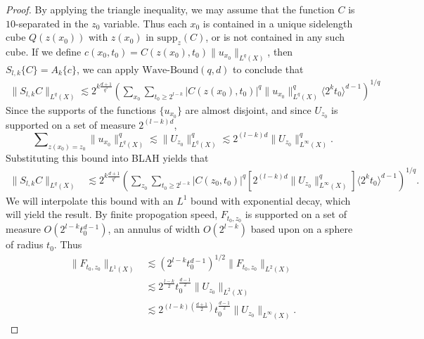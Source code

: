 \begin{proof}
    By applying the triangle inequality, we may assume that the function $C$ is $10$-separated in the $z_0$ variable. Thus each $x_0$ is contained in a unique sidelength cube $Q(z(x_0))$ with $z(x_0)$ in $\text{supp}_z(C)$, or is not contained in any such cube. If we define $c(x_0,t_0) = C(z(x_0),t_0) \| u_{x_0} \|_{L^q(X)}$, then $S_{l,k} \{ C \} = A_k \{ c \}$, we can apply $\text{Wave-Bound}(q,d)$ to conclude that
    \begin{align*}
      \| S_{l,k} C \|_{L^q(X)} \lesssim 2^{k \frac{d+1}{q^*}} \left( \sum\nolimits_{x_0} \sum\nolimits_{t_0 \geq 2^{l-k}} |C(z(x_0),t_0)|^q \| u_{x_0} \|_{L^q(X)}^q \langle 2^k t_0 \rangle^{d-1} \right)^{1/q}
    \end{align*}
    Since the supports of the functions $\{ u_{x_0} \}$ are almost disjoint, and since $U_{z_0}$ is supported on a set of measure $2^{(l-k)d}$,
    \[ \sum\nolimits_{z(x_0) = z_0} \| u_{x_0} \|_{L^q(X)}^q \lesssim \| U_{z_0} \|_{L^q(X)}^q \lesssim 2^{(l-k)d} \| U_{z_0} \|_{L^\infty(X)}^q. \]
    Substituting this bound into BLAH yields that
    \begin{align*}
        \| S_{l,k} C \|_{L^q(X)} &\lesssim 2^{k \frac{d+1}{q'}} \left( \sum\nolimits_{z_0} \sum\nolimits_{t_0 \geq 2^{l-k}} |C(z_0,t_0)|^q \left[ 2^{(l-k)d} \| U_{z_0} \|_{L^\infty(X)}^q \right] \langle 2^k t_0 \rangle^{d-1} \right)^{1/q}.
    \end{align*}
    We will interpolate this bound with an $L^1$ bound with exponential decay, which will yield the result. By finite propogation speed, $F_{t_0,z_0}$ is supported on a set of measure $O( 2^{l-k} t_0^{d-1})$, an annulus of width $O(2^{l-k})$ based upon on a sphere of radius $t_0$. Thus
    \begin{align*}
        \| F_{t_0,z_0} \|_{L^1(X)} &\lesssim \left( 2^{l-k} t_0^{d-1} \right)^{1/2} \| F_{t_0,z_0} \|_{L^2(X)}\\
        &\lesssim 2^{\frac{l-k}{2}} t_0^{\frac{d-1}{2}} \| U_{z_0} \|_{L^2(X)}\\
        &\lesssim 2^{(l-k) \left( \frac{d+1}{2}\right)} t_0^{\frac{d-1}{2}} \| U_{z_0} \|_{L^\infty(X)}.

\end{align*}
\end{proof}
